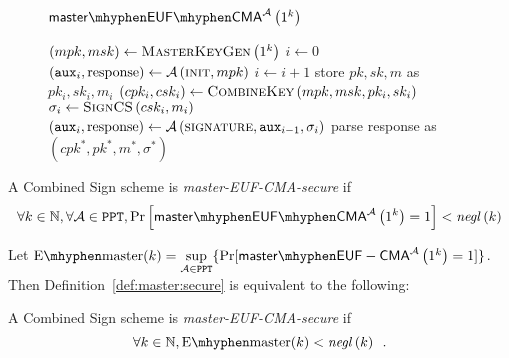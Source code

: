     \begin{figure}[H]
      \begin{gamebox}{$\mathsf{master \mhyphen EUF \mhyphen
      CMA}^{\adversary}\left(1^k\right)$}
        \begin{algorithmic}[1]
          \State $\left(mpk, msk\right) \gets
          \textsc{MasterKeyGen}\left(1^k\right)$
          \State $i \gets 0$
          \State $\left(\mathtt{aux}_i, \mathrm{response}\right) \gets
          \mathcal{A}\left(\textsc{init}, mpk\right)$
            \State $i \gets i + 1$
            \State store $pk, sk, m$ as $pk_i, sk_i, m_i$
            \State $\left(cpk_i, csk_i\right) \gets
            \textsc{CombineKey}\left(mpk, msk, pk_i, sk_i\right)$
            \State $\sigma_i \gets \textsc{SignCS}\left(csk_i, m_i\right)$
            \State $\left(\mathtt{aux}_i, \mathrm{response}\right) \gets
            \mathcal{A}\left(\textsc{signature}, \mathtt{aux}_{i-1},
            \sigma_i\right)$
          \EndWhile
          \State parse response as $\left(cpk^*, pk^*, m^*, \sigma^*\right)$
            \State {}
          \Else
            \State {}
          \EndIf
        \end{algorithmic}
      \end{gamebox}
      \caption{}
      \label{game:comb:master}
    \end{figure}
    \begin{definition}
      \label{def:master:secure}
      A Combined Sign scheme is \emph{\textsf{master-EUF-CMA}-secure} if
      \begin{equation*}
        \forall k \in \mathbb{N}, \forall \adversary \in \mathtt{PPT},
        \Pr\left[\mathsf{master \mhyphen EUF \mhyphen
        CMA}^{\adversary}\left(1^k\right) = 1\right] <
        \mathit{negl}\left(k\right)
      \end{equation*}
    \end{definition}

    Let $\mathrm{E \mhyphen master}(k) = \underset{\adversary \in
    \mathtt{PPT}}{\sup}\{\Pr[\mathsf{master \mhyphen
    EUF-CMA}^{\adversary}\left(1^k\right) = 1]\}$. Then
    Definition~\ref{def:master:secure} is equivalent to the following:

    \begin{definition}
      \label{def:master:secure:sup}
      A Combined Sign scheme is \emph{\textsf{master-EUF-CMA}-secure} if
      \begin{equation*}
        \forall k \in \mathbb{N}, \mathrm{E \mhyphen master}(k) <
        \mathit{negl}\left(k\right) \enspace.
      \end{equation*}
    \end{definition}

